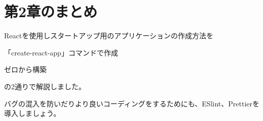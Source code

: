 \section{第2章のまとめ}
\keeplastskip{
  \label{sec:2-5}
  \label{sec-chap02review}
  \par\nobreak
}

Reactを使用しスタートアップ用のアプリケーションの作成方法を

\begin{starteritemize}
\item 「create{-}react{-}app」コマンドで作成
\item ゼロから構築
\end{starteritemize}

の2通りで解説しました。

\vspace*{\baselineskip}

バグの混入を防いだりより良いコーディングをするためにも、ESlint、Prettierを導入しましょう。
